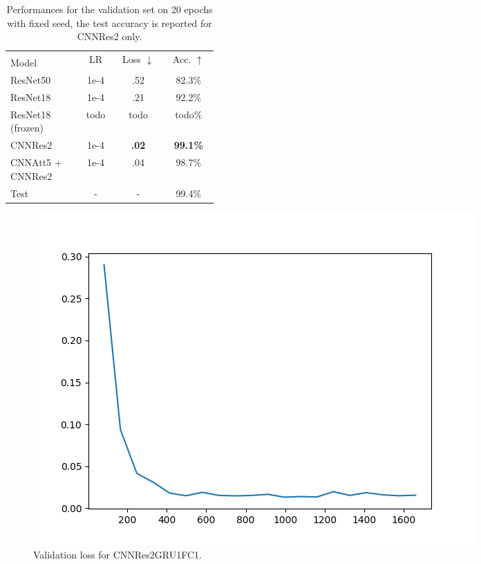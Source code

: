 \documentclass{article}
\begin{document}
\begin{table}[h!]
    \caption{Performances for the validation set on 20 epochs with fixed seed, the test accuracy is reported for CNNRes2 only.}
    \label{tab:joint-results}
    \begin{center}
        \begin{small}
            \begin{tabular}{p{0.35\linewidth} | ccc}
                \toprule
                & \multirow{2}{0.13\linewidth}{LR} 
                & \multirow{2}{0.13\linewidth}{Loss $\downarrow$} 
                & \multirow{2}{0.13\linewidth}{Acc. $\uparrow$} \\
                Model \\
                \midrule
                ResNet50 & 1e-4 & .52 & 82.3\% \\
                ResNet18 & 1e-4 & .21 & 92.2\% \\
                ResNet18 (frozen) & todo & todo & todo\% \\
                CNNRes2 & 1e-4 & \textbf{.02} & \textbf{99.1\%} \\
                CNNAtt5 + CNNRes2 & 1e-4 & .04 & 98.7\% \\
                \midrule
                \midrule
                Test & - & - & 99.4\% \\
                \bottomrule
            \end{tabular}
        \end{small}
    \end{center}
    \vspace{-0.5cm}
\end{table}

\begin{figure}
    \centering
    \includegraphics[scale=.5]{images/val_loss.png}
    \caption{Validation loss for CNNRes2GRU1FC1.}
    \label{fig:val-loss}
\end{figure}
\end{document}
